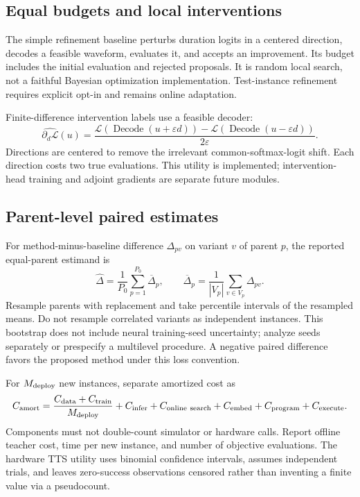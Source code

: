 \documentclass[10pt]{article}
\newcommand{\loss}{\mathcal L}
\begin{document}
\subsection{Equal budgets and local interventions}
The simple refinement baseline perturbs duration logits in a centered direction,
decodes a feasible waveform, evaluates it, and accepts an improvement. Its
budget includes the initial evaluation and rejected proposals. It is random
local search, not a faithful Bayesian optimization implementation. Test-instance
refinement requires explicit opt-in and remains online adaptation.

Finite-difference intervention labels use a feasible decoder:
\begin{equation}
 \widehat{\partial_d\loss}(u)=
 \frac{\loss(\operatorname{Decode}(u+\varepsilon d))
       -\loss(\operatorname{Decode}(u-\varepsilon d))}{2\varepsilon}.
\end{equation}
Directions are centered to remove the irrelevant common-softmax-logit shift.
Each direction costs two true evaluations. This utility is implemented;
intervention-head training and adjoint gradients are separate future modules.

\subsection{Parent-level paired estimates}
For method-minus-baseline difference $\Delta_{pv}$ on variant $v$ of parent $p$,
the reported equal-parent estimand is
\begin{equation}
 \widehat\Delta=\frac1{P_0}\sum_{p=1}^{P_0}\overline\Delta_p,
 \qquad \overline\Delta_p=\frac1{|V_p|}\sum_{v\in V_p}\Delta_{pv}.
\end{equation}
Resample parents with replacement and take percentile intervals of the resampled
means. Do not resample correlated variants as independent instances. This
bootstrap does not include neural training-seed uncertainty; analyze seeds
separately or prespecify a multilevel procedure. A negative paired difference
favors the proposed method under this loss convention.

For $M_{\rm deploy}$ new instances, separate amortized cost as
\begin{equation}
 C_{\rm amort}=\frac{C_{\rm data}+C_{\rm train}}{M_{\rm deploy}}
 +C_{\rm infer}+C_{\rm online\ search}+C_{\rm embed}
 +C_{\rm program}+C_{\rm execute}.
\end{equation}
Components must not double-count simulator or hardware calls. Report offline
teacher cost, time per new instance, and number of objective evaluations. The
hardware TTS utility uses binomial confidence intervals, assumes independent
trials, and leaves zero-success observations censored rather than inventing a
finite value via a pseudocount.
\end{document}
